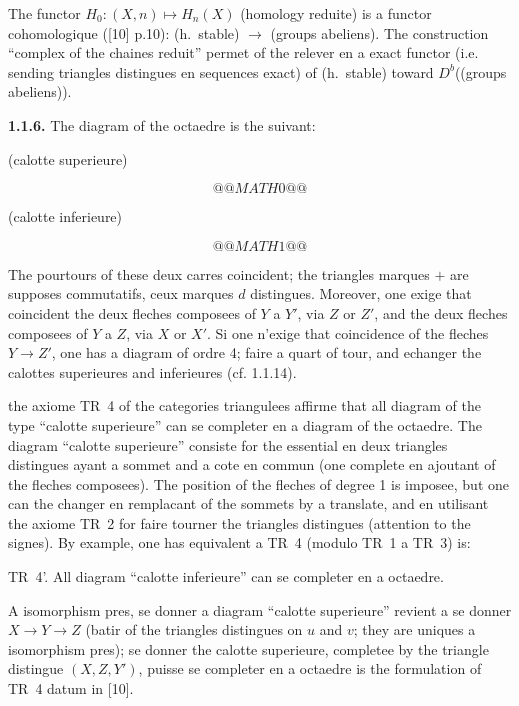\documentclass[12pt,a4paper]{article}
\theoremstyle{plain}
\theoremstyle{definition}
\theoremstyle{remark}
\begin{document}
The functor $H_{0} : (X, n) \longmapsto H_{n}(X)$ (homology reduite) is a functor cohomologique ([10] p.10): (h.~stable) $\to$ (groups abeliens). The construction ``complex of the chaines reduit'' permet of the relever en a exact functor (i.e. sending triangles distingues en sequences exact) of (h.~stable) toward $D^{b}$((groups abeliens)).

\medskip

\noindent
\textbf{1.1.6.} The diagram of the octaedre is the suivant:

\begin{center}
\begin{minipage}{0.45\textwidth}
\centering
(calotte superieure)

\vspace{0.3cm}
\[
@@MATH0@@
\]
\end{minipage}
\hfill
\begin{minipage}{0.45\textwidth}
\centering
(calotte inferieure)

\vspace{0.3cm}
\[
@@MATH1@@
\]
\end{minipage}
\end{center}

The pourtours of these deux carres coincident; the triangles marques $+$ are supposes commutatifs, ceux marques $d$ distingues. Moreover, one exige that coincident the deux fleches composees of $Y$ a $Y'$, via $Z$ or $Z'$, and the deux fleches composees of $Y$ a $Z$, via $X$ or $X'$. Si one n'exige that coincidence of the fleches $Y \to Z'$, one has a diagram of ordre 4; faire a quart of tour, and echanger the calottes superieures and inferieures (cf. 1.1.14).

the axiome TR~4 of the categories triangulees affirme that all diagram of the type ``calotte superieure'' can se completer en a diagram of the octaedre. The diagram ``calotte superieure'' consiste for the essential en deux triangles distingues ayant a sommet and a cote en commun (one complete en ajoutant of the fleches composees). The position of the fleches of degree 1 is imposee, but one can the changer en remplacant of the sommets by a translate, and en utilisant the axiome TR~2 for faire tourner the triangles distingues (attention to the signes). By example, one has equivalent a TR~4 (modulo TR~1 a TR~3) is:

TR~4'. All diagram ``calotte inferieure'' can se completer en a octaedre.

A isomorphism pres, se donner a diagram ``calotte superieure'' revient a se donner $X \to Y \to Z$ (batir of the triangles distingues on $u$ and $v$; they are uniques a isomorphism pres); se donner the calotte superieure, completee by the triangle distingue $(X, Z, Y')$, puisse se completer en a octaedre is the formulation of TR~4 datum in [10].
\end{document}
